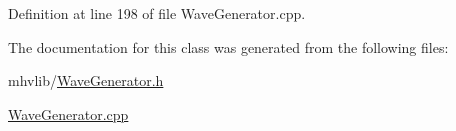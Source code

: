 Definition at line 198 of file Wave\-Generator.\-cpp.



The documentation for this class was generated from the following files\-:\begin{DoxyCompactItemize}
\item 
mhvlib/\hyperlink{_wave_generator_8h}{Wave\-Generator.\-h}\item 
\hyperlink{_wave_generator_8cpp}{Wave\-Generator.\-cpp}\end{DoxyCompactItemize}
